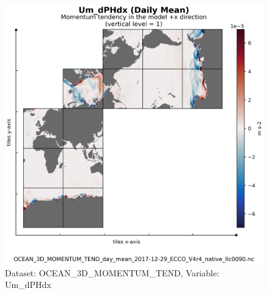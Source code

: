 \begin{figure}[H]
\centering
\includegraphics[scale=0.55]{../images/plots/v4r4/native_plots/Ocean_Three-Dimensional_Momentum_Tendency/Um_dPHdx.png}
\caption{Dataset: OCEAN\_3D\_MOMENTUM\_TEND, Variable: Um\_dPHdx}
\label{tab:table-OCEAN_3D_MOMENTUM_TEND_Um_dPHdx-Plot}
\end{figure}
\newpage
\pagebreak
